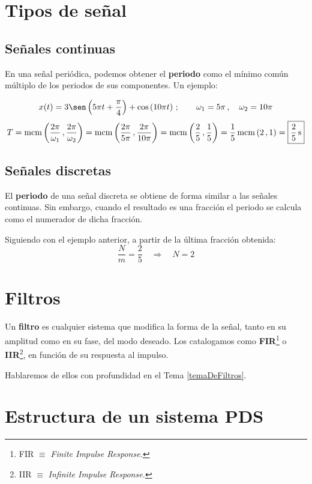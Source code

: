 \documentclass[a4paper]{book}
\begin{document}
\section{Tipos de señal} \vspace{\parskip}

\subsection{Señales continuas}

En una señal periódica, podemos obtener el \textbf{periodo} como el mínimo común múltiplo de los periodos de sus componentes. Un ejemplo:

\[ x(t) = 3 \sen \left( 5\pi t + \frac{\pi}{4} \right) + \cos \left( 10\pi t \right)\, ;\qquad \omega_1 = 5\pi \, , \quad \omega_2 = 10\pi \]
\[ T = \mcm \left( \frac{2\pi}{\omega_1} \, , \frac{2\pi}{\omega_2} \right) = \mcm \left( \frac{2\pi}{5\pi} \, , \frac{2\pi}{10\pi} \right) = \mcm \left( \frac{2}{5} \, , \frac{1}{5} \right) = \frac{1}{5} \mcm \left( 2 \, , 1 \right) = \boxed{\frac{2}{5} \, \unit{\s}}\]

\subsection{Señales discretas}

El \textbf{periodo} de una señal discreta se obtiene de forma similar a las señales continuas. Sin embargo, cuando el resultado es una fracción el periodo se calcula como el numerador de dicha fracción.

Siguiendo con el ejemplo anterior, a partir de la última fracción obtenida:
\[ \frac{N}{m} = \frac{2}{5} \quad \Longrightarrow \quad \boxed{N = 2} \]

\section{Filtros}

Un \textbf{filtro} es cualquier sistema que modifica la forma de la señal, tanto en su amplitud como en su fase, del modo deseado. Los catalogamos como \textbf{FIR}\footnote{FIR $\equiv$ \textit{Finite Impulse Response.}} o \textbf{IIR}\footnote{IIR $\equiv$ \textit{Infinite Impulse Response.}}, en función de su respuesta al impulso.

Hablaremos de ellos con profundidad en el Tema \ref{temaDeFiltros}.

\section{Estructura de un sistema PDS}
\end{document}
